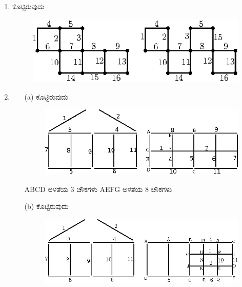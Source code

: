 \begin{enumerate}
\item ಕೊಟ್ಟಿರುವುದು
\begin{figure}[H]
\centering
\includegraphics[scale=0.9]{images/chap9/ans10.eps}

\hspace{4cm}
\end{figure}

\item 

\begin{itemize}
\item[(a)] ಕೊಟ್ಟಿರುವುದು
\begin{figure}[H]
\centering
\hspace{4cm}

\includegraphics[scale=0.9]{images/chap9/ans11a.eps}
\end{figure}

\vskip -0.1cm

ABCD ಅಳತೆಯ 3 ಚೌಕಗಳು AEFG ಅಳತೆಯ 8 ಚೌಕಗಳು 

\item[(b)] ಕೊಟ್ಟಿರುವುದು
\begin{figure}[H]
\centering
\hspace{4cm}

\includegraphics[scale=0.9]{images/chap9/ans11b.eps}


\end{figure}
\end{itemize}
\end{enumerate}
